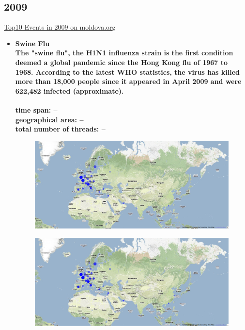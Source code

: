 \documentclass[11pt,a4paper,english]{article}
\begin{document}
\begin{itemize}
						
				\end{itemize}
			
			\subsection{2009}
			\href{http://social.moldova.org/news/10-most-important-world-events-of-2009-217390-eng.html}{Top10 Events in 2009 on moldova.org}
				\begin{itemize}
					\item \bf Swine Flu \rm
						\\ The "swine flu", the H1N1 influenza strain is the first condition deemed a global pandemic since the Hong Kong flu of 1967 to 1968. According to the latest WHO statistics, the virus has killed more than 18,000 people since it appeared in April 2009 and were 622,482 infected (approximate).
						\\\\ \bf time span: \rm --
						\\ \bf geographical area: \rm --
						\\ \bf total number of threads: \rm --
						\begin{figure}[H]
							\vspace{-13pt}
  							\begin{center}
								\includegraphics[width=130mm]{img/pre-birdflu}
							\end{center}
							\vspace{-13pt}
						\end{figure}
						\begin{figure}[H]
							\vspace{-13pt}
	  						\begin{center}
								\includegraphics[width=130mm]{img/post-birdflu}

\end{center}
\end{figure}
\end{itemize}
\end{document}
